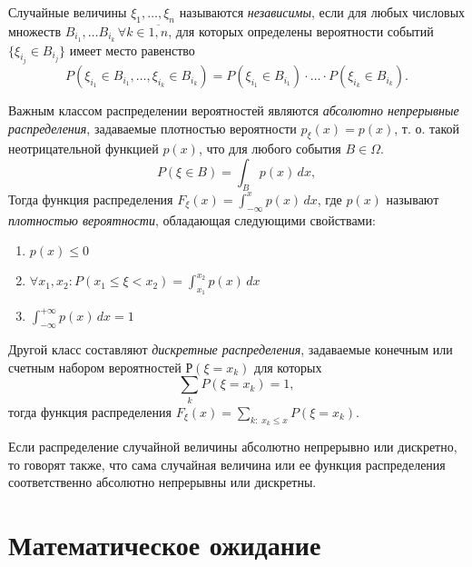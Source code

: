 \begin{defn} Случайные величины $\xi_1,\dots,\xi_n$ называются \textit{независимы}, если для любых числовых множеств $B_{i_1},\dots B_{i_k}\, \forall k\in\overline{1,n}$, для которых определены вероятности событий $\{\xi_{i_j}\in B_{i_j}\}$ имеет место равенство
$$
P(\xi_{i_1}\in B_{i_1},\dots, \xi_{i_k} \in B_{i_k})=P(\xi_{i_1}\in B_{i_1})\cdot\dots\cdot P(\xi_{i_k} \in B_{i_k}).
$$
\end{defn}
Важным классом распределении вероятностей являются \textit{абсолютно непрерывные распределения}, задаваемые плотностью вероятности $p_\xi(x) = p(x)$, т. о. такой неотрицательной функцией $p(x)$, что для любого события $B\in\Omega$.
$$
P(\xi \in B)=\int_B p(x)\,dx,
$$
Тогда функция распределения $F_\xi(x)=\int_{-\infty}^{x}p(x)\,dx$, где $p(x)$ называют \textit{плотностью вероятности}, обладающая следующими свойствами:
\begin{enumerate}
\item 
$p(x)\le 0$
\item 
$\forall x_1,x_2: P(x_1\le\xi<x_2)=\int_{x_1}^{x_2}p(x)\,dx$
\item
$\int_{-\infty}^{+\infty}p(x)\,dx=1$
\end{enumerate}

Другой класс составляют \textit{дискретные распределения}, задаваемые конечным или счетным набором вероятностей $Р(\xi=x_k)$ для которых
$$
\sum\limits_k P(\xi=x_k)=1,
$$
тогда функция распределения $F_\xi(x)=\sum\limits_{k:\; x_k \le x} P(\xi=x_k)$.

Если распределение случайной величины абсолютно непрерывно или дискретно, то говорят также, что сама случайная величина или ее функция распределения соответственно абсолютно непрерывны или дискретны.

\section{Математическое ожидание}

